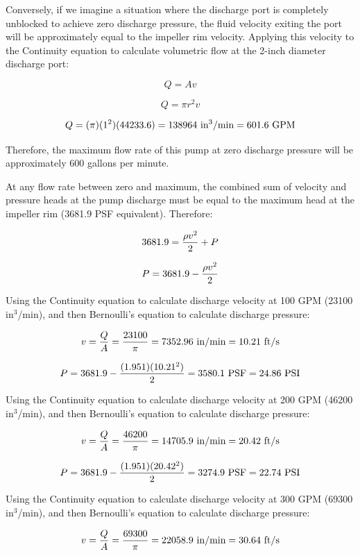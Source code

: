 \vskip 10pt

Conversely, if we imagine a situation where the discharge port is completely unblocked to achieve zero discharge pressure, the fluid velocity exiting the port will be approximately equal to the impeller rim velocity.  Applying this velocity to the Continuity equation to calculate volumetric flow at the 2-inch diameter discharge port:

$$Q = Av$$

$$Q = \pi r^2 v$$

$$Q = (\pi)(1^2)(44233.6) = 138964 \hbox{ in}^3\hbox{/min} = 601.6 \hbox{ GPM}$$

Therefore, the maximum flow rate of this pump at zero discharge pressure will be approximately 600 gallons per minute.

\vskip 10pt

At any flow rate between zero and maximum, the combined sum of velocity and pressure heads at the pump discharge must be equal to the maximum head at the impeller rim (3681.9 PSF equivalent).  Therefore:

$$3681.9 = {\rho v^2 \over 2} + P$$

$$P = 3681.9 - {\rho v^2 \over 2}$$

\vskip 20pt

Using the Continuity equation to calculate discharge velocity at 100 GPM (23100 in$^{3}$/min), and then Bernoulli's equation to calculate discharge pressure:

$$v = {Q \over A} = {23100 \over \pi} = 7352.96 \hbox{ in/min} = 10.21 \hbox{ ft/s}$$

$$P = 3681.9 - {(1.951) (10.21^2) \over 2} = 3580.1 \hbox{ PSF} = 24.86 \hbox{ PSI}$$

\vskip 20pt

\filbreak

Using the Continuity equation to calculate discharge velocity at 200 GPM (46200 in$^{3}$/min), and then Bernoulli's equation to calculate discharge pressure:

$$v = {Q \over A} = {46200 \over \pi} = 14705.9 \hbox{ in/min} = 20.42 \hbox{ ft/s}$$

$$P = 3681.9 - {(1.951) (20.42^2) \over 2} = 3274.9 \hbox{ PSF} = 22.74 \hbox{ PSI}$$

\vskip 20pt

Using the Continuity equation to calculate discharge velocity at 300 GPM (69300 in$^{3}$/min), and then Bernoulli's equation to calculate discharge pressure:

$$v = {Q \over A} = {69300 \over \pi} = 22058.9 \hbox{ in/min} = 30.64 \hbox{ ft/s}$$

